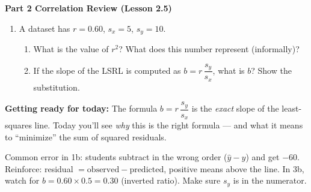 \documentclass[10pt]{article}
\begin{document}
\vspace{0.22in}

{\large\bfseries\color{navy} Part 2 \quad Correlation Review (Lesson 2.5)}

\vspace{0.12in}

\begin{enumerate}[leftmargin=1.6em, itemsep=0.18in, start=3]

  \item A dataset has $r = 0.60$, $s_x = 5$, $s_y = 10$.

        \begin{enumerate}[label=\textbf{(\alph*)}, leftmargin=1.6em, itemsep=6pt]
          \item What is the value of $r^2$?  What does this number represent (informally)?\\[8pt]

          \item If the slope of the LSRL is computed as $b = r\,\dfrac{s_y}{s_x}$, what is $b$?
                Show the substitution.\\[8pt]
        \end{enumerate}

\end{enumerate}

\vspace{0.14in}

\begin{tcolorbox}[colback=greenbg, colframe=greenacc, boxrule=0.8pt, arc=2mm,
    left=4mm, right=4mm, top=3mm, bottom=3mm]
\small\textbf{Getting ready for today:} The formula $b = r\,\dfrac{s_y}{s_x}$ is the
\emph{exact} slope of the least-squares line. Today you'll see \emph{why} this is the right
formula --- and what it means to ``minimize'' the sum of squared residuals.
\end{tcolorbox}

\begin{teachernote}
Common error in 1b: students subtract in the wrong order ($\hat{y} - y$) and get $-60$.
Reinforce: residual $= \text{observed} - \text{predicted}$, positive means above the line.
In 3b, watch for $b = 0.60 \times 0.5 = 0.30$ (inverted ratio). Make sure $s_y$ is in the numerator.
\end{teachernote}
\end{document}
